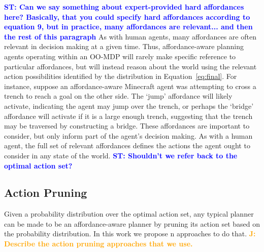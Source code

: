 \documentclass[conference]{IEEEtran}
\newcommand{\stnote}[1]{\textcolor{Blue}{\textbf{ST: #1}}}
\newcommand{\jnote}[1]{\textcolor{Orange}{\textbf{J: #1}}}
\begin{document}
\stnote{Can we say something about expert-provided hard affordances
  here?  Basically, that you could specify hard affordances according
  to equation 9, but in practice, many affordances are relevant... and
  then the rest of this paragraph} As with human agents, many
affordances are often relevant in decision making at a given time.
Thus, affordance-aware planning agents operating within an OO-MDP will
rarely make specific reference to particular affordances, but will
instead reason about the world using the relevant action possibilities
identified by the distribution in Equation~\ref{eq:final}. For
instance, suppose an affordance-aware Minecraft agent was attempting
to cross a trench to reach a goal on the other side. The `jump'
affordance will likely activate, indicating the agent may jump over
the trench, or perhaps the `bridge' affordance will activate if it is
a large enough trench, suggesting that the trench may be traversed by
constructing a bridge. These affordances are important to consider,
but only inform part of the agent's decision making. As with a human
agent, the full set of relevant affordances defines the actions the
agent ought to consider in any state of the world.
\stnote{Shouldn't we refer back to the optimal action set? }

\subsection{Action Pruning}
Given a probability distribution over the optimal action set, any typical
planner can be made to be an affordance-aware planner by pruning its action
set based on the probability distribution. In this work we propose n approaches to do that.
\jnote{Describe the action pruning approaches that we use.}


\end{document}
